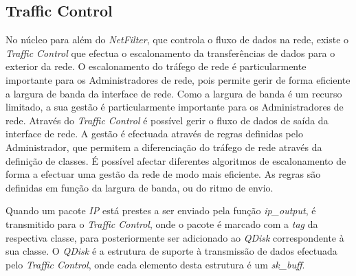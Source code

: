 \subsection{Traffic Control}
\label{sub:traffic_control}


No núcleo para além do \textit{NetFilter}, que controla o fluxo de dados na rede, existe o \textit{Traffic Control} que efectua o escalonamento da transferências de dados para o exterior da rede.
O escalonamento do tráfego de rede é particularmente importante para os Administradores de rede, pois permite gerir de forma eficiente a largura de banda da interface de rede.
Como a largura de banda é um recurso limitado, a sua gestão é particularmente importante para os Administradores de rede.
Através do \textit{Traffic Control} é possível gerir o fluxo de dados de saída da interface de rede.
A gestão é efectuada através de regras definidas pelo Administrador, que permitem a diferenciação do tráfego de rede através da definição de classes.
É possível afectar diferentes algoritmos de escalonamento de forma a efectuar uma gestão da rede de modo mais eficiente.
As regras são definidas em função da largura de banda, ou do ritmo de envio.

Quando um pacote \textit{IP} está prestes a ser enviado pela função \textit{ip\_output}, é transmitido para o \textit{Traffic Control}, onde o pacote é marcado com a \textit{tag} da respectiva classe, para posteriormente ser adicionado ao \textit{QDisk} correspondente à sua classe.
O \textit{QDisk} é a estrutura de suporte à transmissão de dados efectuada pelo \textit{Traffic Control}, onde cada elemento desta estrutura é um \textit{sk\_buff}.


